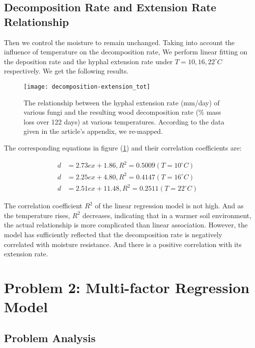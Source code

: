 \documentclass{mcmthesis}
\begin{document}
\subsection{Decomposition Rate and Extension Rate Relationship}

Then we control the moisture to remain unchanged. Taking into account the influence of temperature on the decomposition rate,  We perform linear fitting on the deposition rate and the hyphal extension rate under $ T=10, 16, 22^{\circ}C $ respectively. We get the following results. 

\begin{figure}[H]
  \small
  \centering
  \texttt{[image: decomposition-extension\_tot]}
  \caption{The relationship between the hyphal extension rate (mm/day) of various fungi and the resulting wood decomposition rate (\% mass loss over 122 days) at various temperatures. \cite{lustenhouwer2020trait} According to the data given in the article's appendix, we re-mapped.}
  \label{decomposition-extension_tot}
\end{figure}

The corresponding equations in figure (\ref{decomposition-extension_tot}) and their correlation coefficients are: 

\begin{equation}
  \begin{split}
    d&=2.73ex+1.86,R^2=0.5009 (T=10^{\circ}C) \\
    d&=2.25ex+4.80,R^2=0.4147 (T=16^{\circ}C) \\
    d&=2.51ex+11.48,R^2=0.2511 (T=22^{\circ}C)
  \end{split}
\end{equation}

The correlation coefficient $ R^{2} $ of the linear regression model is not high. And as the temperature rises, $ R^{2} $ decreases, indicating that in a warmer soil environment, the actual relationship is more complicated than linear association. However, the model has sufficiently reflected that the decomposition rate is negatively correlated with moisture resistance. And there is a positive correlation with its extension rate.

\section{Problem 2: Multi-factor Regression Model}

\subsection{Problem Analysis}
\end{document}
